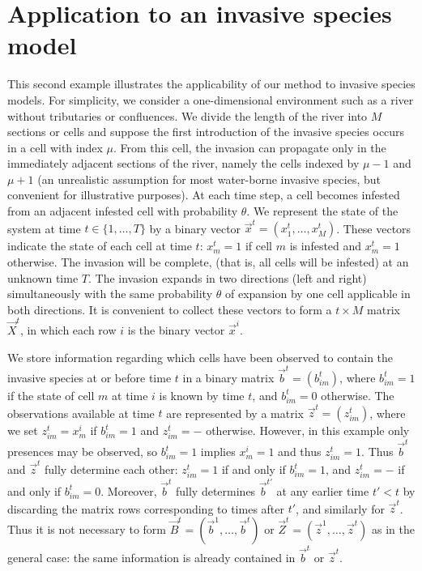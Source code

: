 \section{Application to an invasive species model}
\label{sec:7}

This second example illustrates the applicability of our method to invasive species models. For simplicity, we consider a one-dimensional environment such as a river without tributaries or confluences. We divide the length of the river into $M$ sections or cells and suppose the first introduction of the invasive species occurs in a cell with index $\mu$. From this cell, the invasion can propagate only in the immediately adjacent sections of the river, namely the cells indexed by $\mu-1$ and $\mu+1$ (an unrealistic assumption for most water-borne invasive species, but convenient for illustrative purposes). At each time step, a cell becomes infested from an adjacent infested cell with probability $\theta$. We represent the state of the system at time $t \in \{ 1, \dots, T \}$ by a binary vector $\vec{x}^{t} = (x_1^{t}, \dots, x_{M}^{t})$. These vectors indicate the state of each cell at time $t$: $x_m^t = 1$ if cell $m$ is infested and $x_m^t = 1$ otherwise. The invasion will be complete, (that is, all cells will be infested) at an unknown time $T$. 
The invasion expands in two directions (left and right) simultaneously with the same probability $\theta$ of expansion by one cell applicable in both directions. It is convenient to collect these vectors to form a $t\times M$ matrix $\vec{X}^{t}$, in which each row $i$ is the binary vector $\vec{x}^{i}$.

We store information regarding which cells have been observed to contain the invasive species at or before time $t$ in a binary matrix $\vec{b}^t = (b_{im}^t)$, where $b_{im}^t = 1$ if the state of cell $m$ at time $i$ is known by time $t$, and $b_{im}^t = 0$ otherwise. The observations available at time $t$ are represented by a matrix $\vec{z}^t = (z_{im}^t)$, where we set $z_{im}^t = x^i_m$ if $b_{im}^t = 1$ and $z_{im}^t = -$ otherwise. However, in this example only presences may be observed, so $b_{im}^t = 1$ implies $x_m^i = 1$ and thus $z_{im}^t = 1$. Thus $\vec{b}^t$ and $\vec{z}^t$ fully determine each other: $z_{im}^t = 1$ if and only if $b_{im}^t = 1$, and $z_{im}^t = -$ if and only if $b_{im}^t = 0$. Moreover, $\vec{b}^t$ fully determines $\vec{b}^{t'}$ at any earlier time $t' < t$ by discarding the matrix rows corresponding to times after $t'$, and similarly for $\vec{z}^t$. Thus it is not necessary to form $\vec{B}^t = (\vec{b}^1,\ldots,\vec{b}^t)$ or $\vec{Z}^t = (\vec{z}^1,\ldots,\vec{z}^t)$ as in the general case: the same information is already contained in $\vec{b}^t$ or $\vec{z}^t$.

